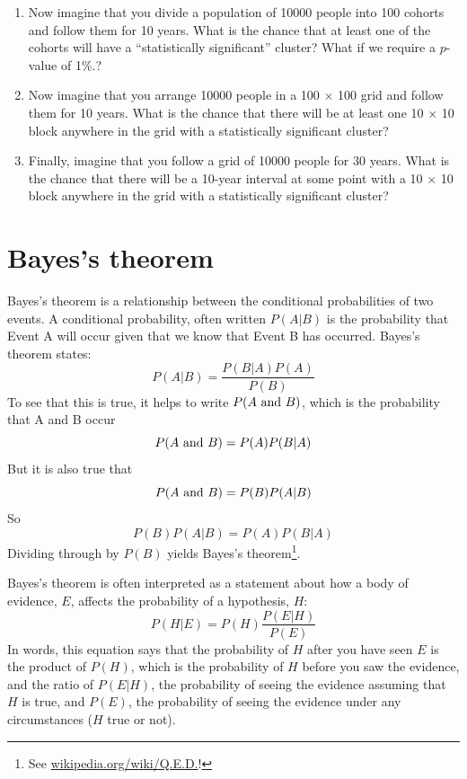 \documentclass[12pt]{book}
\begin{document}
\begin{ex}
\begin{enumerate}
\item Now imagine that you divide a population of 10000 people into 100
  cohorts and follow them for 10 years.  What is the chance that at
  least one of the cohorts will have a ``statistically significant''
  cluster?  What if we require a $p$-value of 1\%.?

\item Now imagine that you arrange 10000 people in a 100 $\times$ 100
  grid and follow them for 10 years.  What is the chance that there
  will be at least one 10 $\times$ 10 block anywhere in the grid
  with a statistically significant cluster?

\item Finally, imagine that you follow a grid of 10000 people for 30
  years.  What is the chance that there will be a 10-year interval
  at some point with a 10 $\times$ 10 block anywhere in the grid
  with a statistically significant cluster?

\end{enumerate}

\end{ex}



\section{Bayes's theorem}

Bayes's theorem is a relationship between the conditional probabilities
of two events.  A conditional probability, often written $P(A|B)$ is
the probability that Event A will occur given that we know that
Event B has occurred.  Bayes's theorem states:
%
\[ P(A|B) = \frac{P(B|A)P(A)}{P(B)} \]
%
To see that this is true, it helps to write $P(A ~\mbox{and}~ B)$, which
is the probability that A and B occur
%
\[ P(A ~\mbox{and}~ B) = P(A) P(B|A) \]
%
But it is also true that 
%
\[ P(A ~\mbox{and}~ B) = P(B) P(A|B) \]
%
So
%
\[ P(B) P(A|B) = P(A) P(B|A) \]
%
Dividing through by $P(B)$ yields Bayes's theorem\footnote{See
\url{wikipedia.org/wiki/Q.E.D.}!}.


Bayes's theorem is often interpreted as a statement about 
how a body of evidence, $E$, affects the probability of a 
hypothesis, $H$:
%
\[ P(H|E) = P(H) \frac{P(E|H)}{P(E)} \]
%
In words, this equation says that the probability of $H$ after you
have seen $E$ is the product of $P(H)$, which is the probability of
$H$ before you saw the evidence, and the ratio of $P(E|H)$, the
probability of seeing the evidence assuming that $H$ is true, and
$P(E)$, the probability of seeing the evidence under any circumstances
($H$ true or not).
\end{document}
